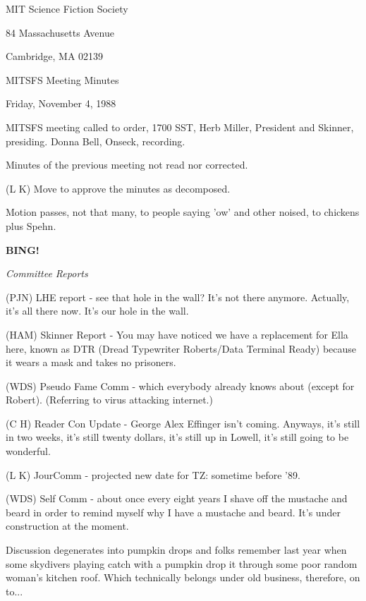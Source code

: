 \documentclass[12pt]{article}
\newcommand{\bing}{{\bf BING!} }
\newcommand{\goto}[1]{\bing \vskip 12pt \centerline{{\em{#1}}}}
\begin{document}
\begin{center}

MIT Science Fiction Society 

84 Massachusetts Avenue

Cambridge, MA 02139

\vspace{12pt}

MITSFS Meeting Minutes 

Friday, November 4, 1988

\end{center}
 
\vspace{18pt}

\setlength{\parskip}{6pt}

\noindent
MITSFS meeting called to order, 1700 SST, Herb Miller, President and Skinner, presiding. Donna Bell, Onseck, recording.

Minutes of the previous meeting not read nor corrected.

(L K) Move to approve the minutes as decomposed.

Motion passes, not that many, to people saying 'ow' and other noised, to chickens plus Spehn.

\goto{Committee Reports}

(PJN) LHE report - see that hole in the wall?  It's not there anymore. Actually, it's all there now. It's our hole in the wall.

(HAM) Skinner Report - You may have noticed we have a replacement for Ella here, known as DTR (Dread Typewriter Roberts/Data Terminal Ready) because it wears a mask and takes no prisoners.

(WDS) Pseudo Fame Comm - which everybody already knows about (except for Robert). (Referring to virus attacking internet.)

(C H) Reader Con Update - George Alex Effinger isn't coming. Anyways, it's still in two weeks, it's still twenty dollars, it's still up in Lowell, it's still going to be wonderful.

(L K) JourComm - projected new date for TZ: sometime before '89.

(WDS) Self Comm - about once every eight years I shave off the mustache and beard in order to remind myself why I have a mustache and beard. It's under construction at the moment.

Discussion degenerates into pumpkin drops and folks remember last year when some skydivers playing catch with a pumpkin drop it through some poor random woman's kitchen roof. Which technically belongs under old business, therefore, on to...
\end{document}
